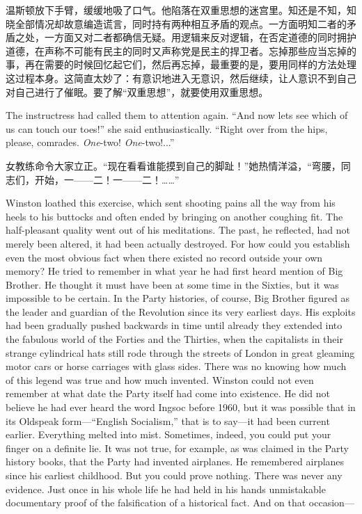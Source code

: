 \begin{paracol}{2}
\switchcolumn

温斯顿放下手臂，缓缓地吸了口气。他陷落在双重思想的迷宫里。知还是不知，知晓全部情况却故意编造谎言，同时持有两种相互矛盾的观点。一方面明知二者的矛盾之处，一方面又对二者都确信无疑。用逻辑来反对逻辑，在否定道德的同时拥护道德，在声称不可能有民主的同时又声称党是民主的捍卫者。忘掉那些应当忘掉的事，再在需要的时候回忆起它们，然后再忘掉，最重要的是，要用同样的方法处理这过程本身。这简直太妙了：有意识地进入无意识，然后继续，让人意识不到自己对自己进行了催眠。要了解``双重思想''，就要使用双重思想。

\switchcolumn*

The instructress had called them to attention again. ``And now
let\textquotesingle s see which of us can touch our toes!'' she said
enthusiastically. ``Right over from the hips, please, comrades.
\emph{One}-two! \emph{One}-two!...''

\switchcolumn

女教练命令大家立正。``现在看看谁能摸到自己的脚趾！''她热情洋溢，``弯腰，同志们，开始，一——二！一——二！\ldots\ldots''

\switchcolumn*

Winston loathed this exercise, which sent shooting pains all the way
from his heels to his buttocks and often ended by bringing on another
coughing fit. The half-pleasant quality went out of his meditations. The
past, he reflected, had not merely been altered, it had been actually
destroyed. For how could you establish even the most obvious fact when
there existed no record outside your own memory? He tried to remember in
what year he had first heard mention of Big Brother. He thought it must
have been at some time in the Sixties, but it was impossible to be
certain. In the Party histories, of course, Big Brother figured as the
leader and guardian of the Revolution since its very earliest days. His
exploits had been gradually pushed backwards in time until already they
extended into the fabulous world of the Forties and the Thirties, when
the capitalists in their strange cylindrical hats still rode through the
streets of London in great gleaming motor cars or horse carriages with
glass sides. There was no knowing how much of this legend was true and
how much invented. Winston could not even remember at what date the
Party itself had come into existence. He did not believe he had ever
heard the word Ingsoc before 1960, but it was possible that in its
Oldspeak form---``English Socialism,'' that is to say---it had been
current earlier. Everything melted into mist. Sometimes, indeed, you
could put your finger on a definite lie. It was not true, for example,
as was claimed in the Party history books, that the Party had invented
airplanes. He remembered airplanes since his earliest childhood. But you
could prove nothing. There was never any evidence. Just once in his
whole life he had held in his hands unmistakable documentary proof of
the falsification of a historical fact. And on that occasion---


\end{paracol}
